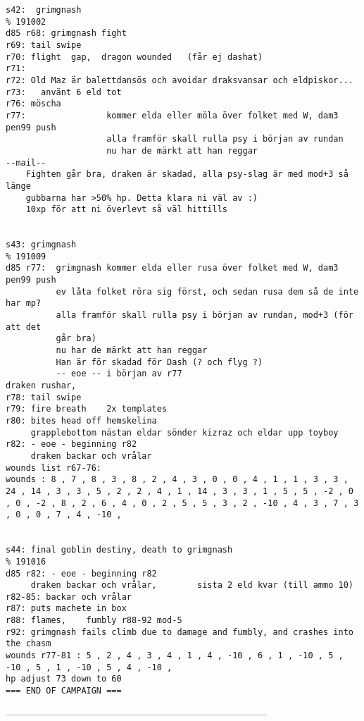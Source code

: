\begin{verbatim}
s42:  grimgnash                                                         % 191002
d85 r68: grimgnash fight
r69: tail swipe
r70: flight  gap,  dragon wounded   (får ej dashat)
r71: 
r72: Old Maz är balettdansös och avoidar draksvansar och eldpiskor...
r73:   använt 6 eld tot
r76: möscha
r77:                kommer elda eller möla över folket med W, dam3 pen99 push
                    alla framför skall rulla psy i början av rundan
                    nu har de märkt att han reggar
--mail--
    Fighten går bra, draken är skadad, alla psy-slag är med mod+3 så länge
    gubbarna har >50% hp. Detta klara ni väl av :)
    10xp för att ni överlevt så väl hittills


s43: grimgnash                                                          % 191009
d85 r77:  grimgnash kommer elda eller rusa över folket med W, dam3 pen99 push
          ev låta folket röra sig först, och sedan rusa dem så de inte har mp?
          alla framför skall rulla psy i början av rundan, mod+3 (för att det 
          går bra)
          nu har de märkt att han reggar
          Han är för skadad för Dash (? och flyg ?)
          -- eoe -- i början av r77
draken rushar, 
r78: tail swipe
r79: fire breath    2x templates
r80: bites head off hemskelina
     grapplebottom nästan eldar sönder kizraz och eldar upp toyboy
r82: - eoe - beginning r82
     draken backar och vrålar
wounds list r67-76: 
wounds : 8 , 7 , 8 , 3 , 8 , 2 , 4 , 3 , 0 , 0 , 4 , 1 , 1 , 3 , 3 , 24 , 14 , 3 , 3 , 5 , 2 , 2 , 4 , 1 , 14 , 3 , 3 , 1 , 5 , 5 , -2 , 0 , 0 , -2 , 8 , 2 , 6 , 4 , 0 , 2 , 5 , 5 , 3 , 2 , -10 , 4 , 3 , 7 , 3 , 0 , 0 , 7 , 4 , -10 ,


s44: final goblin destiny, death to grimgnash                           % 191016
d85 r82: - eoe - beginning r82
     draken backar och vrålar,        sista 2 eld kvar (till ammo 10)
r82-85: backar och vrålar
r87: puts machete in box
r88: flames,    fumbly r88-92 mod-5
r92: grimgnash fails climb due to damage and fumbly, and crashes into the chasm
wounds r77-81 : 5 , 2 , 4 , 3 , 4 , 1 , 4 , -10 , 6 , 1 , -10 , 5 , -10 , 5 , 1 , -10 , 5 , 4 , -10 ,
hp adjust 73 down to 60
=== END OF CAMPAIGN ===
\end{verbatim} \normalsize













--------------------------------------------------------------------------------











